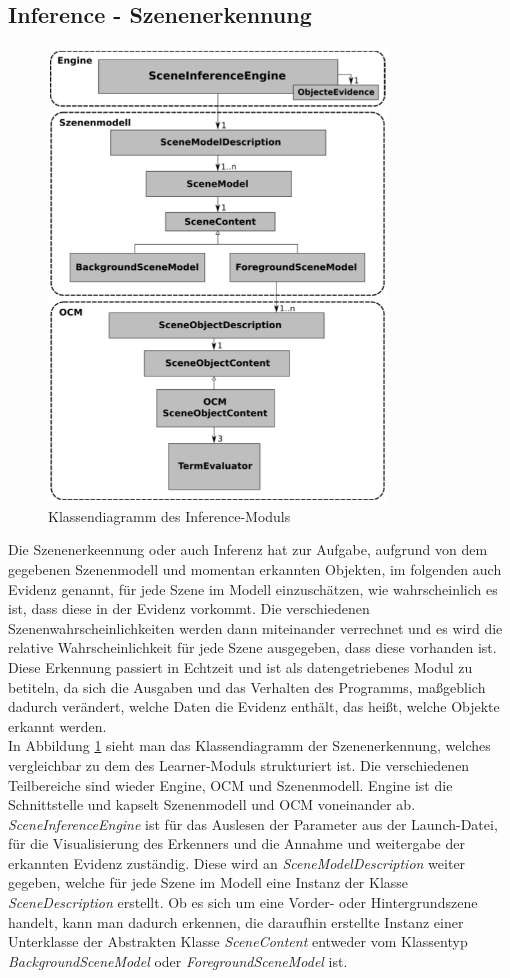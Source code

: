 \subsection{Inference - Szenenerkennung}\label{sub:inference}
\begin{figure}
	\centering
	\includegraphics[width=9cm]{bilder/InferenceClass.pdf}
	\caption{Klassendiagramm des Inference-Moduls \cite{gehrung14}}
	\label{img:inferenceclass}
\end{figure}
Die Szenenerkeennung oder auch Inferenz hat zur Aufgabe, aufgrund von dem gegebenen Szenenmodell und momentan erkannten Objekten, im folgenden auch Evidenz genannt, für jede Szene im Modell einzuschätzen, wie wahrscheinlich es ist, dass diese in der Evidenz vorkommt. Die verschiedenen Szenenwahrscheinlichkeiten werden dann miteinander verrechnet und es wird die relative Wahrscheinlichkeit für jede Szene ausgegeben, dass diese vorhanden ist. Diese Erkennung passiert in Echtzeit und ist als datengetriebenes Modul zu betiteln, da sich die Ausgaben und das Verhalten des Programms, maßgeblich dadurch verändert, welche Daten die Evidenz enthält, das heißt, welche Objekte erkannt werden.\smallskip\\
In Abbildung \ref{img:inferenceclass} sieht man das Klassendiagramm der Szenenerkennung, welches vergleichbar zu dem des Learner-Moduls strukturiert ist. Die verschiedenen Teilbereiche sind wieder Engine, OCM und Szenenmodell. Engine ist die Schnittstelle und kapselt Szenenmodell und OCM voneinander ab. \textit{SceneInferenceEngine} ist für das Auslesen der Parameter aus der Launch-Datei, für die Visualisierung des Erkenners und die Annahme und weitergabe der erkannten Evidenz zuständig. Diese wird an \textit{SceneModelDescription} weiter gegeben, welche für jede Szene im Modell eine Instanz der Klasse \textit{SceneDescription} erstellt. Ob es sich um eine Vorder- oder Hintergrundszene handelt, kann man dadurch erkennen, die daraufhin erstellte Instanz einer Unterklasse der Abstrakten Klasse \textit{SceneContent} entweder vom Klassentyp \textit{BackgroundSceneModel} oder \textit{ForegroundSceneModel} ist. \smallskip\\
